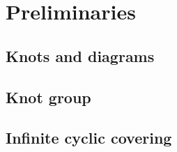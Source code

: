 \section{Preliminaries}\label{sec1}

\subsection{Knots and diagrams}



\subsection{Knot group}



\subsection{Infinite cyclic covering}


